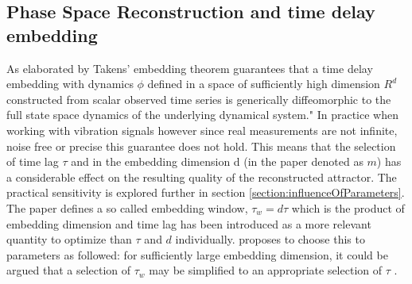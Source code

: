 \subsection{Phase Space Reconstruction and time delay embedding}
As elaborated by \textcite{Tan_2023} Takens' embedding theorem guarantees that a time delay embedding with dynamics $\phi$ defined in a space of sufficiently high dimension $R^d$ constructed from scalar observed time series is generically diffeomorphic to the full state space dynamics of the underlying dynamical system." In practice when working with vibration signals however since real measurements are not infinite, noise free or precise this guarantee does not hold. This means that the selection of time lag $\tau$ and in the embedding dimension d (in the paper denoted as $m$)  has a considerable effect on the resulting quality of the reconstructed attractor. The practical sensitivity is explored further in section \ref{section:influenceOfParameters}.\\
The paper defines a so called embedding window, $\tau_w = d\tau$ which is the product of embedding dimension and time lag has been introduced as a more relevant quantity to optimize than $\tau$ and $d$ individually.
\cite{Tan_2023} proposes to choose this to parameters as followed: for sufficiently large embedding dimension, it
could be argued that a selection of $\tau_w$ may be simplified to an appropriate selection of $\tau$ .
